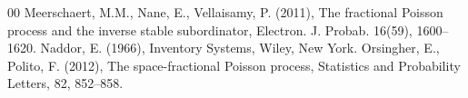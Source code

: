 \documentclass[12pt, twoside, english, headsepline]{article}
\theoremstyle{definition} %
\numberwithin{equation}{section} %
\begin{document}
{\begin{thebibliography}{00}
Meerschaert, M.M., Nane, E., Vellaisamy, P. (2011), The fractional Poisson process and the inverse
stable subordinator, Electron. J. Probab. 16(59), 1600--1620.
%
%
Naddor, E. (1966), Inventory Systems, Wiley, New York.
%
%
%
%
%
Orsingher, E., Polito, F. (2012),  The space-fractional Poisson process, Statistics and Probability Letters, 82, 852--858.


\end{thebibliography}}
\end{document}
